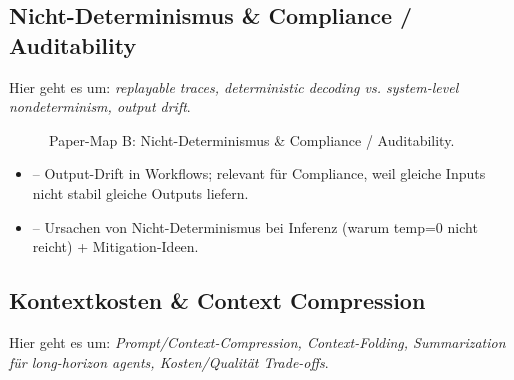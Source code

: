 \subsection{Nicht-Determinismus \& Compliance / Auditability}
Hier geht es um: \emph{replayable traces, deterministic decoding vs. system-level nondeterminism, output drift}.

\begin{figure}[htbp]
\centering
{}
\caption{Paper-Map B: Nicht-Determinismus \& Compliance / Auditability.}
\label{fig:paper-map-b}
\end{figure}

\begin{itemize}
  \item \cite{khatchadourian2025llm_output_drift} -- Output-Drift in Workflows; relevant für Compliance, weil gleiche Inputs nicht stabil gleiche Outputs liefern.
  \item \cite{yuan2025numerical_sources_nondeterminism} -- Ursachen von Nicht-Determinismus bei Inferenz (warum temp=0 nicht reicht) + Mitigation-Ideen.
\end{itemize}

\subsection{Kontextkosten \& Context Compression}
Hier geht es um: \emph{Prompt/Context-Compression, Context-Folding, Summarization für long-horizon agents, Kosten/Qualität Trade-offs}.

